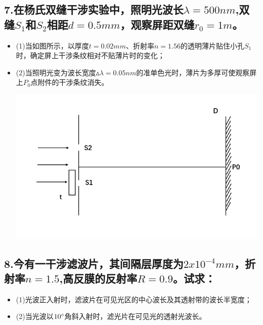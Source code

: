 \documentclass[11pt,a4paper]{article}
\begin{document}
    \subsection*{7.在杨氏双缝干涉实验中，照明光波长$\lambda =500nm$,双缝$S_1$和$S_2$相距$d=0.5mm$，观察屏距双缝$r_0=1m$。}
    \begin{itemize}
        \vspace{0mm}
        \item (1)当如图所示，以厚度$t=0.02mm$、折射率$n=1.56$的透明薄片贴住小孔$S_1$时，确定屏上干涉条纹相对不贴薄片时的变化；
        \vspace{0mm}
        \item (2)当照明光变为波长宽度$\vartriangle \lambda=0.05nm$的准单色光时，薄片为多厚可使观察屏上$P_0$点附件的干涉条纹消失。
        
        \includegraphics[scale=0.2]{2.png}%
    \end{itemize}
    \vspace{20mm}
    \subsection*{8.今有一干涉滤波片，其间隔层厚度为$2x10^{-4}mm$，折射率$n=1.5$,高反膜的反射率$R=0.9$。试求：}
    \begin{itemize}
        \vspace{0mm}
        \item (1)光波正入射时，滤波片在可见光区的中心波长及其透射带的波长半宽度；
        \vspace{0mm}
        \item (2)当光波以$10\degree$角斜入射时，滤光片在可见光的透射光波长。
        \vspace{0mm}
    \end{itemize}
    \vspace{20mm}
\end{document}
